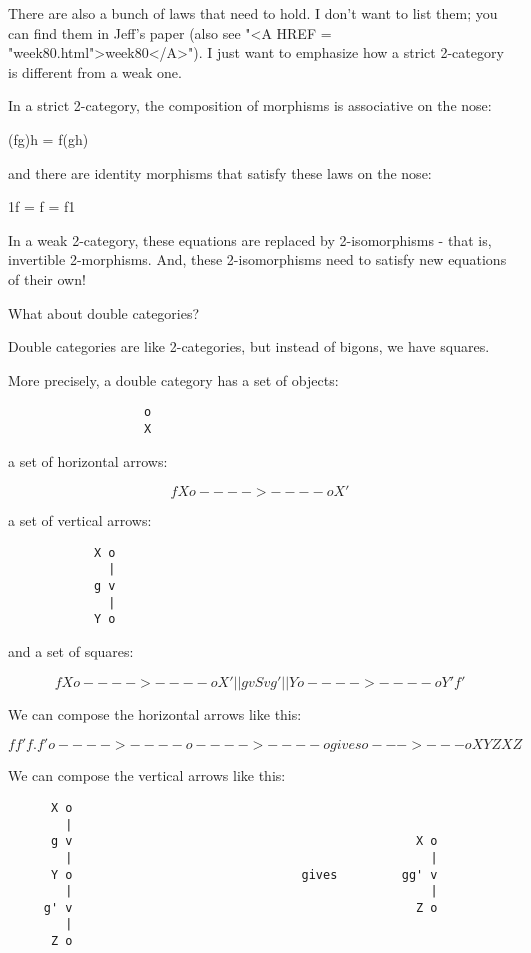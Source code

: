 There are also a bunch of laws that need to hold.  I don't want to
list them; you can find them in Jeff's paper (also see "<A HREF =
"week80.html">week80</A>").  I just want to emphasize how a
strict 2-category is different from a weak one.

In a strict 2-category, the composition of morphisms is associative
on the nose:

(fg)h = f(gh)

and there are identity morphisms that satisfy these laws on the nose:

1f = f = f1 

In a weak 2-category, these equations are replaced by 2-isomorphisms - that 
is, invertible 2-morphisms.  And, these 2-isomorphisms need to satisfy new 
equations of their own!

What about double categories?

Double categories are like 2-categories, but instead of bigons, we have 
squares.  

More precisely, a double category has a set of objects:

\begin{verbatim}
                   o 
                   X
\end{verbatim}
    
a set of horizontal arrows:

$$
                   f           
            X o---->----o X'
$$
    
a set of vertical arrows:

\begin{verbatim}
            X o
              |
            g v
              |
            Y o
\end{verbatim}
    
and a set of squares:

$$
                f
         X o---->----o X'
           |         |
         g v    S    v g'
           |         |
         Y o---->----o Y' 
                f'
$$
    
We can compose the horizontal arrows like this:

$$
            f         f'                                  f.f'
       o---->----o---->----o             gives         o--->---o
       X         Y         Z                           X       Z
$$
    
We can compose the vertical arrows like this:

\begin{verbatim}
      X o
        |
      g v                                                X o
        |                                                  |
      Y o                                gives         gg' v
        |                                                  |
     g' v                                                Z o
        |
      Z o
\end{verbatim}
    
